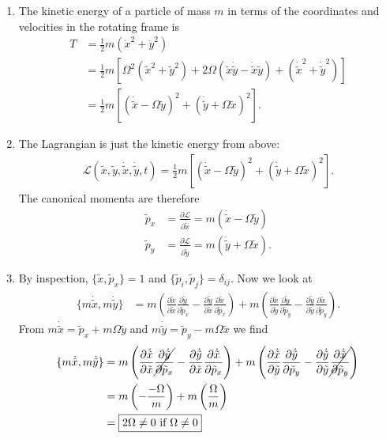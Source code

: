 \documentclass{article}
\theoremstyle{definition}
\newcommand{\p}{\partial}
\newcommand{\lag}{\mathcal{L}}
\newcommand{\f}[2]{\frac{#1}{#2}}
\newcommand{\lp}{\left(}
\newcommand{\rp}{\right)}
\newcommand{\lb}{\left[}
\newcommand{\rb}{\right]}
\begin{document}
\begin{enumerate}[label=\alph*)]
	\item The kinetic energy of a particle of mass $m$ in terms of the coordinates and velocities in the rotating frame is 
	\begin{align*}
		T 
		&= \f{1}{2} m (\dot{x}^2 + \dot{y}^2)\\ 
		&= \f{1}{2}m \lb \Omega^2 (\tilde{x}^2 + \tilde{y}^2) + 2\Omega (\tilde{x}\dot{\tilde{y}} - \dot{\tilde{x}}\tilde{y}) + (\dot{\tilde{x}}^2 + \dot{\tilde{y}}^2)  \rb \\
		&= {\f{1}{2}m \lb  ( \dot{\tilde{x}} - \Omega \tilde{y})^2 + (\dot{\tilde{y}} + \Omega \tilde{x} )^2 \rb}.
	\end{align*}
	
	\item The Lagrangian is just the kinetic energy from above:
	\begin{align*}
		\lag(\tilde{x}, \tilde{y}, \dot{\tilde{x}}, \dot{\tilde{y}}, t) =  {\f{1}{2}m \lb  ( \dot{\tilde{x}} - \Omega \tilde{y})^2 + (\dot{\tilde{y}} + \Omega \tilde{x} )^2 \rb}.
	\end{align*}
	The canonical momenta are therefore
	\begin{align*}
		\tilde{p}_x &= \f{\p \lag}{\p \dot{\tilde{x}}} = m(\dot{\tilde{x}} - \Omega \tilde{y}) \\
		\tilde{p}_y &= \f{\p \lag}{\p \dot{\tilde{y}}} = m(\dot{\tilde{y}} + \Omega \tilde{x}).
	\end{align*}
	
	\item By inspection, $\{\tilde{x}, \tilde{p}_x\} = 1$ and $\{ \tilde{p}_i, \tilde{p}_j \} = \delta_{ij}$. Now we look at  
	\begin{align*}
		\{ m\dot{\tilde{x}}, m\dot{\tilde{y}} \} &= m\lp \f{\p \dot{\tilde{x}} }{\p \tilde{x}}
		{\f{\p \dot{\tilde{y}} }{\p \tilde{p}_x}} - \f{\p \dot{\tilde{y}}}{\p \tilde{x}}\f{\p \dot{\tilde{x}}}{\p \tilde{p}_x}\rp + 
		m\lp \f{\p \dot{\tilde{x}} }{\p \tilde{y}}\f{\p \dot{\tilde{y}} }{\p \tilde{p}_y} - \f{\p \dot{\tilde{y}}}{\p \tilde{y}} {\f{\p \dot{\tilde{x}}}{\p \tilde{p}_y}}\rp.
	\end{align*}
	From $m\dot{\tilde{x}} = \tilde{p}_x + m\Omega \tilde{y}$ and $m\dot{\tilde{y}} = \tilde{p}_y - m\Omega \tilde{x}$ we find 
	\begin{align*}
		\{ m\dot{\tilde{x}}, m\dot{\tilde{y}} \} 
		&= m\lp \f{\p \dot{\tilde{x}} }{\p \tilde{x}}
		\cancel{\f{\p \dot{\tilde{y}} }{\p \tilde{p}_x}} - \f{\p \dot{\tilde{y}}}{\p \tilde{x}}\f{\p \dot{\tilde{x}}}{\p \tilde{p}_x}\rp + 
		m\lp \f{\p \dot{\tilde{x}} }{\p \tilde{y}}\f{\p \dot{\tilde{y}} }{\p \tilde{p}_y} - \f{\p \dot{\tilde{y}}}{\p \tilde{y}} \cancel{\f{\p \dot{\tilde{x}}}{\p \tilde{p}_y}}\rp\\
		&= m\lp-\f{-\Omega}{m}\rp + m\lp \f{\Omega}{m} \rp \\
		&= \boxed{2\Omega \neq 0 \text{ if } \Omega \neq 0}
	\end{align*}
	

\end{enumerate}
\end{document}

